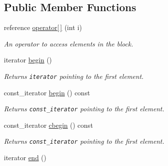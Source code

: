 \subsection*{Public Member Functions}
\begin{CompactItemize}
\item 
\hypertarget{group__mnglayer_gb90a755bf03c0113dd37014f6f8dc53d}{
reference \hyperlink{group__mnglayer_gb90a755bf03c0113dd37014f6f8dc53d}{operator\mbox{[}$\,$\mbox{]}} (int i)}
\label{group__mnglayer_gb90a755bf03c0113dd37014f6f8dc53d}

\begin{CompactList}\small\item\em An operator to access elements in the block. \item\end{CompactList}\item 
\hypertarget{group__mnglayer_gcae10d17bbcc8af7c10ef052283aa7e9}{
iterator \hyperlink{group__mnglayer_gcae10d17bbcc8af7c10ef052283aa7e9}{begin} ()}
\label{group__mnglayer_gcae10d17bbcc8af7c10ef052283aa7e9}

\begin{CompactList}\small\item\em Returns {\tt iterator} pointing to the first element. \item\end{CompactList}\item 
\hypertarget{group__mnglayer_gd5a7afcaa6b7c4762e831c43648fb5af}{
const\_\-iterator \hyperlink{group__mnglayer_gd5a7afcaa6b7c4762e831c43648fb5af}{begin} () const }
\label{group__mnglayer_gd5a7afcaa6b7c4762e831c43648fb5af}

\begin{CompactList}\small\item\em Returns {\tt const\_\-iterator} pointing to the first element. \item\end{CompactList}\item 
\hypertarget{group__mnglayer_gbc98bc4725bb92fc30627633816097ef}{
const\_\-iterator \hyperlink{group__mnglayer_gbc98bc4725bb92fc30627633816097ef}{cbegin} () const }
\label{group__mnglayer_gbc98bc4725bb92fc30627633816097ef}

\begin{CompactList}\small\item\em Returns {\tt const\_\-iterator} pointing to the first element. \item\end{CompactList}\item 
\hypertarget{group__mnglayer_g1b89fe04df5d14b3e1cf536298331413}{
iterator \hyperlink{group__mnglayer_g1b89fe04df5d14b3e1cf536298331413}{end} ()}
\label{group__mnglayer_g1b89fe04df5d14b3e1cf536298331413}


\end{CompactItemize}

